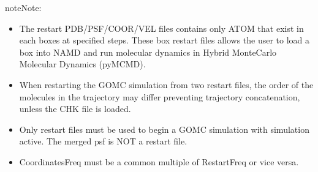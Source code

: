 \documentclass[letterpaper,10pt,english]{sphinxmanual}
\begin{document}
\begin{sphinxadmonition}{note}{Note:}\begin{itemize}
\item {} 
\sphinxAtStartPar
The restart PDB/PSF/COOR/VEL files contains only ATOM that exist in each boxes at specified steps.  These box restart files allows the user to load a box into NAMD and run molecular dynamics in Hybrid Monte\sphinxhyphen{}Carlo Molecular Dynamics (py\sphinxhyphen{}MCMD).

\item {} 
\sphinxAtStartPar
When restarting the GOMC simulation from two restart files, the order of the molecules in the trajectory may differ preventing trajectory concatenation, unless the CHK file is loaded.

\item {} 
\sphinxAtStartPar
Only restart files must be used to begin a GOMC simulation with  simulation active.  The merged psf is NOT a restart file.

\item {} 
\sphinxAtStartPar
CoordinatesFreq must be a common multiple of RestartFreq or vice versa.

\end{itemize}
\end{sphinxadmonition}
\end{document}
